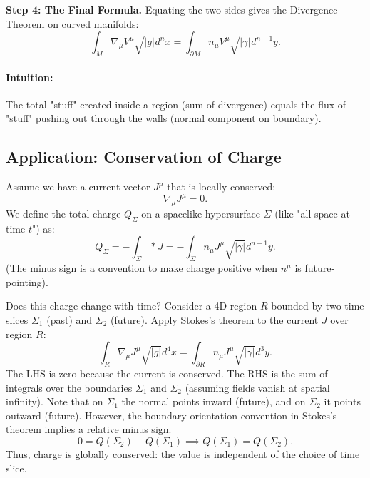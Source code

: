 \documentclass[11pt, a4paper]{report}
\begin{document}
\textbf{Step 4: The Final Formula.}
Equating the two sides gives the Divergence Theorem on curved manifolds:
\begin{equation}
\label{eq:divergence_theorem}
\int_M \nabla_\mu V^\mu \sqrt{|g|} d^n x = \int_{\partial M} n_\mu V^\mu \sqrt{|\gamma|} d^{n-1} y.
\end{equation}

\paragraph{Intuition:} The total "stuff" created inside a region (sum of divergence) equals the flux of "stuff" pushing out through the walls (normal component on boundary).

\subsection*{Application: Conservation of Charge}
Assume we have a current vector $J^\mu$ that is locally conserved:
\begin{equation}
\nabla_\mu J^\mu = 0.
\end{equation}
We define the total charge $Q_\Sigma$ on a spacelike hypersurface $\Sigma$ (like "all space at time $t$") as:
\begin{equation}
Q_\Sigma = - \int_\Sigma *J = - \int_\Sigma n_\mu J^\mu \sqrt{|\gamma|} d^{n-1} y.
\end{equation}
(The minus sign is a convention to make charge positive when $n^\mu$ is future-pointing).

Does this charge change with time? Consider a 4D region $R$ bounded by two time slices $\Sigma_1$ (past) and $\Sigma_2$ (future).
Apply Stokes's theorem to the current $J$ over region $R$:
\begin{equation}
\int_R \nabla_\mu J^\mu \sqrt{|g|} d^4 x = \int_{\partial R} n_\mu J^\mu \sqrt{|\gamma|} d^3 y.
\end{equation}
The LHS is zero because the current is conserved.
The RHS is the sum of integrals over the boundaries $\Sigma_1$ and $\Sigma_2$ (assuming fields vanish at spatial infinity).
Note that on $\Sigma_1$ the normal points inward (future), and on $\Sigma_2$ it points outward (future). However, the boundary orientation convention in Stokes's theorem implies a relative minus sign.
\begin{equation}
0 = Q(\Sigma_2) - Q(\Sigma_1) \implies Q(\Sigma_1) = Q(\Sigma_2).
\end{equation}
Thus, charge is globally conserved: the value is independent of the choice of time slice.
\end{document}
